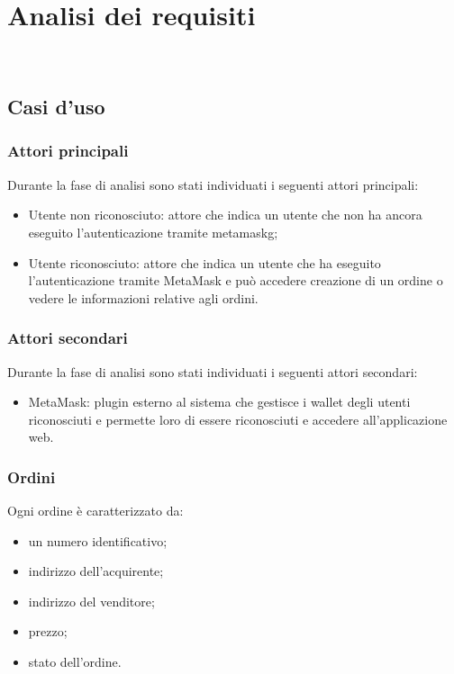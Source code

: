 
\chapter{Analisi dei requisiti}
\label{cap:analisi-requisiti}

\\

\section{Casi d'uso}

\subsection{Attori principali}
Durante la fase di analisi sono stati individuati i seguenti attori principali:
\begin{itemize}
    \item Utente non riconosciuto: attore che indica un utente che non ha ancora eseguito l'autenticazione tramite \gls{metamaskg}\glsfirstoccur;
    \item Utente riconosciuto: attore che indica un utente che ha eseguito l'autenticazione tramite MetaMask e può accedere creazione di un ordine o vedere le informazioni relative agli ordini.
\end{itemize}

\subsection{Attori secondari}
Durante la fase di analisi sono stati individuati i seguenti attori secondari:
\begin{itemize}
    \item MetaMask: plugin esterno al sistema che gestisce i wallet degli utenti riconosciuti e permette loro di essere riconosciuti e accedere all'applicazione web.
\end{itemize}

\subsection{Ordini}
Ogni ordine è caratterizzato da:
\begin{itemize}
    \item un numero identificativo;
    \item indirizzo dell'acquirente;
    \item indirizzo del venditore;
    \item prezzo;
    \item stato dell'ordine.
\end{itemize}

